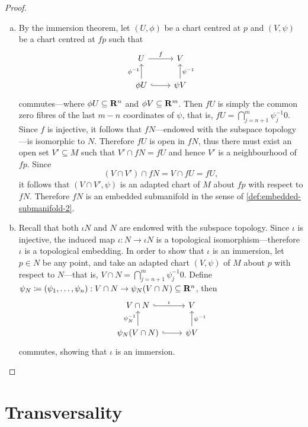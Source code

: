 \begin{proof}
\begin{enumerate}[(a)]\setlength\itemsep{0em}
\item By the immersion theorem, let \((U, \phi)\) be a chart centred at \(p\)
  and \((V, \psi)\) be a chart centred at \(f p\) such that
  \[
  \begin{tikzcd}
  U \ar[r, "f"] &V \\
  \phi U \ar[u, "\phi^{-1}"] \ar[r, hook] &\psi V \ar[u, "\psi^{-1}"']
  \end{tikzcd}
  \]
  commutes---where \(\phi U \subseteq \mathbf{R}^n\) and \(\phi V \subseteq \mathbf{R}^m\). Then
  \(f U\) is simply the common zero fibres of the last \(m-n\) coordinates of
  \(\psi\), that is, \(f U = \bigcap_{j=n+1}^m \psi_j^{-1} 0\). Since \(f\) is
  injective, it follows that \(f N\)---endowed with the subspace topology---is
  isomorphic to \(N\). Therefore \(f U\) is open in \(f N\), thus there must
  exist an open set \(V' \subseteq M\) such that \(V' \cap f N = f U\) and hence
  \(V'\) is a neighbourhood of \(f p\). Since
  \[
  (V \cap V') \cap f N = V \cap f U = f U,
  \]
  it follows that \((V \cap V', \psi)\) is an adapted chart of \(M\) about \(f
  p\) with respect to \(f N\). Therefore \(f N\) is an embedded submanifold in
  the sense of \cref{def:embedded-submanifold-2}.

\item Recall that both \(\iota N\) and \(N\) are endowed with the subspace
  topology. Since \(\iota\) is injective, the induced map
  \(\iota: N \to \iota N\) is a topological isomorphism---therefore \(\iota\) is
  a topological embedding. In order to show that \(\iota\) is an immersion, let
  \(p \in N\) be any point, and take an adapted chart \((V, \psi)\) of \(M\)
  about \(p\) with respect to \(N\)---that is,
  \(V \cap N = \bigcap_{j=n+1}^m \psi_j^{-1} 0\). Define \(\psi_N \coloneq
  (\psi_1, \dots, \psi_n): V \cap N \to \psi_N(V \cap N) \subseteq \mathbf{R}^n\), then
  \[
  \begin{tikzcd}
  V \cap N \ar[r, hook, "\iota"] &V \\
  \psi_N(V \cap N) \ar[u, "\psi_N^{-1}"] \ar[r, hook]
  &\psi V \ar[u, "\psi^{-1}"']
  \end{tikzcd}
  \]
  commutes, showing that \(\iota\) is an immersion.
\end{enumerate}
\end{proof}

\section{Transversality}

